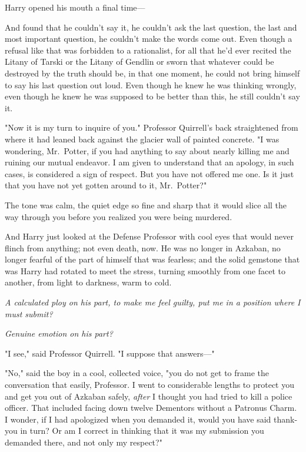 Harry opened his mouth a final time---

And found that he couldn't say it, he couldn't ask the last question, the last 
and most important question, he couldn't make the words come out. Even though a 
refusal like that was forbidden to a rationalist, for all that he'd ever 
recited the Litany of Tarski or the Litany of Gendlin or sworn that whatever 
could be destroyed by the truth should be, in that one moment, he could not 
bring himself to say his last question out loud. Even though he knew he was 
thinking wrongly, even though he knew he was supposed to be better than this, 
he still couldn't say it.

"Now it is my turn to inquire of you." Professor Quirrell's back straightened 
from where it had leaned back against the glacier wall of painted concrete. "I 
was wondering, Mr.~Potter, if you had anything to say about nearly killing me 
and ruining our mutual endeavor. I am given to understand that an apology, in 
such cases, is considered a sign of respect. But you have not offered me one. 
Is it just that you have not yet gotten around to it, Mr.~Potter?"

The tone was calm, the quiet edge so fine and sharp that it would slice all the 
way through you before you realized you were being murdered.

And Harry just looked at the Defense Professor with cool eyes that would never 
flinch from anything; not even death, now. He was no longer in Azkaban, no 
longer fearful of the part of himself that was fearless; and the solid gemstone 
that was Harry had rotated to meet the stress, turning smoothly from one facet 
to another, from light to darkness, warm to cold.

\emph{A calculated ploy on his part, to make me feel guilty, put me in a 
position where I must submit?}

\emph{Genuine emotion on his part?}

"I see," said Professor Quirrell. "I suppose that answers---"

"No," said the boy in a cool, collected voice, "you do not get to frame the 
conversation that easily, Professor. I went to considerable lengths to protect 
you and get you out of Azkaban safely, \emph{after} I thought you had tried to 
kill a police officer. That included facing down twelve Dementors without a 
Patronus Charm. I wonder, if I had apologized when you demanded it, would you 
have said thank-you in turn? Or am I correct in thinking that it was my 
submission you demanded there, and not only my respect?"

